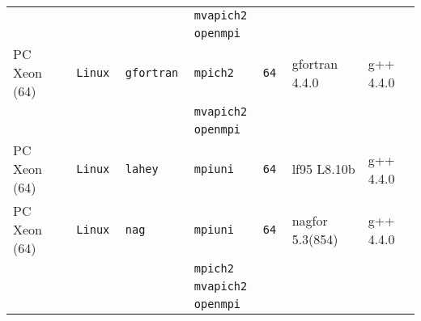 \begin{longtable}{lllllll}
                      &           &                 &\tt mvapich2   &                    &                                    &                                 \\
                      &           &                 &\tt openmpi    &                    &                                    &                                 \\
PC Xeon (64)          &\tt Linux  &\tt gfortran     &\tt mpich2     &\tt 64              & gfortran \footnotesize 4.4.0       & g++  \footnotesize 4.4.0        \\ %
                      &           &                 &\tt mvapich2   &                    &                                    &                                 \\
                      &           &                 &\tt openmpi    &                    &                                    &                                 \\
PC Xeon (64)          &\tt Linux  &\tt lahey        &\tt mpiuni     &\tt 64              & lf95 \footnotesize L8.10b          & g++  \footnotesize 4.4.0        \\ %
PC Xeon (64)          &\tt Linux  &\tt nag          &\tt mpiuni     &\tt 64              & nagfor \footnotesize 5.3(854)      & g++  \footnotesize 4.4.0        \\ %
                      &           &                 &\tt mpich2     &                    &                                    &                                 \\
                      &           &                 &\tt mvapich2   &                    &                                    &                                 \\
                      &           &                 &\tt openmpi    &                    &                                    &                                 \\

\end{longtable}
